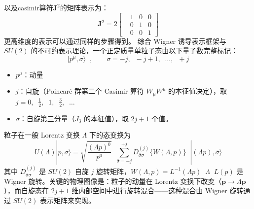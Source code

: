 以及casimir算符$\pmb{J}^2$的矩阵表示为：
\begin{equation}
    \pmb{J}^2=
    2
    \begin{bmatrix}
        & 1&0&0\\
        & 0&1&0\\
        & 0&0&1
    \end{bmatrix}
\end{equation}
更高维度的表示可以通过同样的步骤得到。
综合 Wigner 诱导表示框架与 $SU(2)$ 的不可约表示理论，一个正定质量单粒子态由以下量子数完整标记：
\begin{equation}
|p^\mu,\sigma\rangle\;\;,\qquad \sigma = -j,\;\;-j+1,\;\;\ldots,\;\;+j
\end{equation}
\begin{itemize}
\item $p^\mu$：动量
\item $j$：自旋（Poincar\'{e} 群第二个 Casimir 算符 $W_\mu W^\mu$ 的本征值决定），取 $j = 0,\;\;\tfrac{1}{2},\;\;1,\;\;\tfrac{3}{2},\;\;\ldots$
\item $\sigma$：自旋第三分量（$J_3$ 的本征值），取 $2j+1$ 个值。
\end{itemize}

粒子在一般 Lorentz 变换 $\Lambda$ 下的态变换为
\begin{equation}
U(\Lambda)|p,\sigma\rangle
= \sqrt{\frac{(\Lambda p)^0}{p^0}}\;\;
\sum_{\bar{\sigma}=-j}^{+j} D^{(j)}_{\bar{\sigma}\sigma}\{W(\Lambda,p)\}\;\;
|(\Lambda p),\bar{\sigma}\rangle
\end{equation}
其中 $D^{(j)}_{\bar{\sigma}\sigma}$ 是 $SU(2)$ 自旋 $j$  旋转矩阵，$W(\Lambda,p) = L^{-1}(\Lambda p)\;\;\Lambda\;\;L(p)$ 是 Wigner 旋转。关键的物理图像是：粒子的动量在 Lorentz 变换下改变（$\boldsymbol{p}\to\Lambda\boldsymbol{p}$），而自旋态在 $2j+1$ 维内部空间中进行旋转混合——这种混合由 Wigner 旋转通过 $SU(2)$ 表示矩阵来实现。